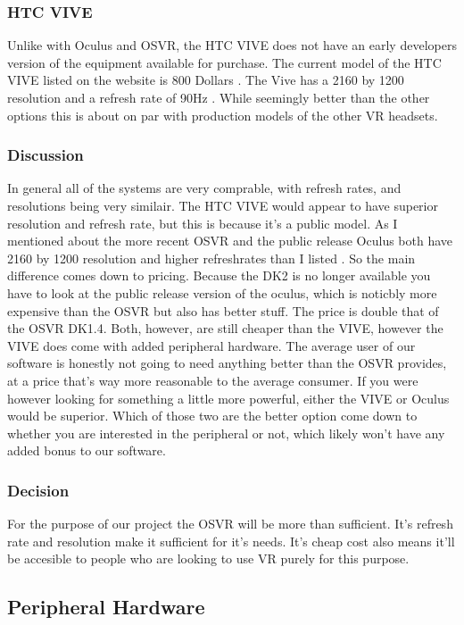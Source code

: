 \subsubsection{HTC VIVE}
Unlike with Oculus and OSVR, the HTC VIVE does not have an early developers version of the equipment available for purchase.
The current model of the HTC VIVE listed on the website is 800 Dollars .
The Vive has a 2160 by 1200 resolution and a refresh rate of 90Hz .
While seemingly better than the other options this is about on par with production models of the other VR headsets.

\subsubsection{Discussion}
In general all of the systems are very comprable, with refresh rates, and resolutions being very similair.
The HTC VIVE would appear to have superior resolution and refresh rate, but this is because it's a public model.
As I mentioned  about the more recent OSVR and the public release Oculus both have 2160 by 1200 resolution and higher refreshrates than I listed .
So the main difference comes down to pricing.
Because the DK2 is no longer available you have to look at the public release version of the oculus, which is noticbly more expensive than the OSVR but also has better stuff.
The price is double that of the OSVR DK1.4.
Both, however, are still cheaper than the VIVE, however the VIVE does come with added peripheral hardware.
The average user of our software is honestly not going to need anything better than the OSVR provides, at a price that's way more reasonable to the average consumer.
If you were however looking for something a little more powerful, either the VIVE or Oculus would be superior.
Which of those two are the better option come down to whether you are interested in the peripheral or not, which likely won't have any added bonus to our software.

\subsubsection{Decision}
For the purpose of our project the OSVR will be more than sufficient.
It's refresh rate and resolution make it sufficient for it's needs.
It's cheap cost also means it'll be accesible to people who are looking to use VR purely for this purpose.


\subsection{Peripheral Hardware}
